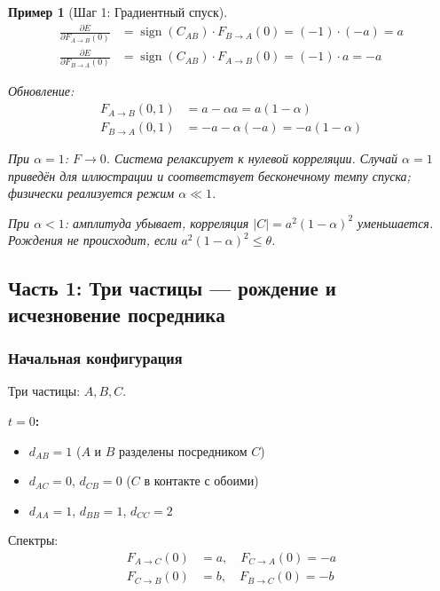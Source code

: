 \documentclass[12pt,a4paper]{article}
\newtheorem{example}{Пример}[section]
\begin{document}
\begin{example}[Шаг 1: Градиентный спуск]
\begin{align}
    \frac{\partial E}{\partial F_{A \to B}(0)} &= \operatorname{sign}(C_{AB}) \cdot F_{B \to A}(0) = (-1) \cdot (-a) = a \\
    \frac{\partial E}{\partial F_{B \to A}(0)} &= \operatorname{sign}(C_{AB}) \cdot F_{A \to B}(0) = (-1) \cdot a = -a
\end{align}

Обновление:
\begin{align}
    F_{A \to B}(0, 1) &= a - \alpha a = a(1 - \alpha) \\
    F_{B \to A}(0, 1) &= -a - \alpha(-a) = -a(1 - \alpha)
\end{align}

При $\alpha = 1$: $F \to 0$. Система релаксирует к нулевой корреляции. Случай $\alpha = 1$ приведён для иллюстрации и соответствует бесконечному темпу спуска; физически реализуется режим $\alpha \ll 1$.

При $\alpha < 1$: амплитуда убывает, корреляция $|C| = a^2(1-\alpha)^2$ уменьшается.
Рождения не происходит, если $a^2(1-\alpha)^2 \leq \theta$.
\end{example}

\subsection{Часть 1: Три частицы --- рождение и исчезновение посредника}

\subsubsection{Начальная конфигурация}

Три частицы: $A, B, C$.

\textbf{$t = 0$:}
\begin{itemize}
    \item $d_{AB} = 1$ ($A$ и $B$ разделены посредником $C$)
    \item $d_{AC} = 0$, $d_{CB} = 0$ ($C$ в контакте с обоими)
    \item $d_{AA} = 1$, $d_{BB} = 1$, $d_{CC} = 2$
\end{itemize}

Спектры:
\begin{align}
    F_{A \to C}(0) &= a, \quad F_{C \to A}(0) = -a \\
    F_{C \to B}(0) &= b, \quad F_{B \to C}(0) = -b
\end{align}
\end{document}
